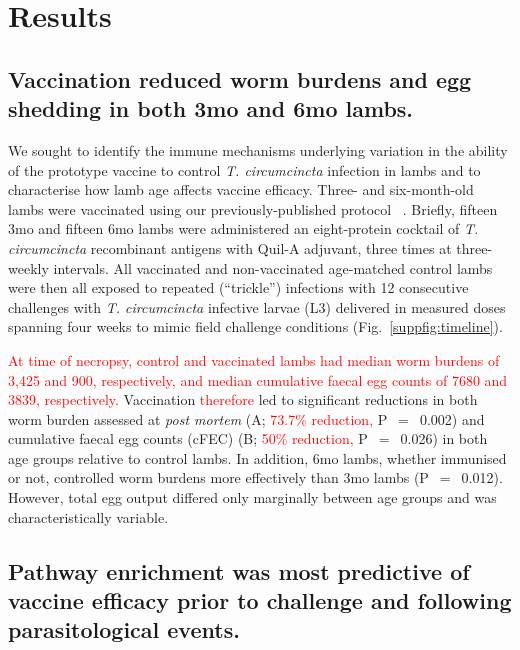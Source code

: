 \documentclass[a4paper, hidelinks, 11pt]{article}
\begin{document}
\section{Results}

\subsection{Vaccination reduced worm burdens and egg shedding in
both 3mo and 6mo lambs.}

We sought to identify the immune mechanisms underlying variation in the ability
of the prototype vaccine to control \emph{T. circumcincta} infection in lambs
and to characterise how lamb age affects vaccine efficacy. Three- and
six-month-old lambs were vaccinated using our previously-published protocol
~\supercite{Nisbet2013}. Briefly, fifteen 3mo and fifteen 6mo lambs were
administered an eight-protein cocktail of \emph{T. circumcincta} recombinant
antigens with Quil-A adjuvant, three times at three-weekly intervals. All
vaccinated and non-vaccinated age-matched control lambs were then all exposed
to repeated (``trickle'') infections with 12 consecutive challenges with
\emph{T. circumcincta} infective larvae (L3) delivered in measured doses
spanning four weeks to mimic field challenge conditions (Fig.~\ref{suppfig:timeline}).


\textcolor{red}{At time of necropsy, control and vaccinated lambs had median worm burdens of 3,425 and 900, respectively, and median cumulative faecal egg counts of 7680 and 3839, respectively.} Vaccination \textcolor{red}{therefore} led to significant reductions in both worm burden assessed at
\emph{post mortem} (A; \textcolor{red}{73.7\% reduction,} P~\(=\)~0.002) and cumulative
faecal egg counts (cFEC) (B; \textcolor{red}{50\% reduction,} P~\(=\)~0.026) in both age
groups relative to control lambs. In addition, 6mo lambs, whether immunised or
not, controlled worm burdens more effectively than 3mo lambs (P~\(=\)~0.012).
However, total egg output differed only marginally between age groups and was
characteristically variable.

\subsection{Pathway enrichment was most predictive of vaccine efficacy prior
to challenge and following parasitological events.}
\end{document}
